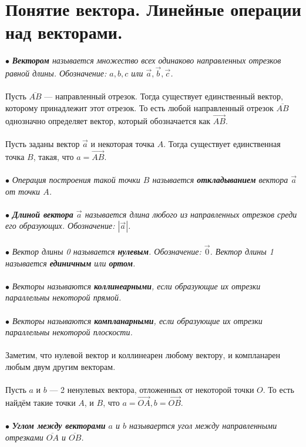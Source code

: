 \section{Понятие вектора. Линейные операции над векторами.}
$\bullet$ \textit{\textbf{Вектором} называется множество всех одинаково направленных отрезков равной длины. Обозначение: $a,b,c$ или $\vec{a}, \vec{b}, \vec{c}$.}\\\\
Пусть $\overline{AB}$ --- направленный отрезок. Тогда существует единственный вектор, которому принадлежит этот отрезок. То есть любой направленный отрезок $\overline{AB}$ однозначно определяет вектор, который обозначается как $\overrightarrow{AB}$.\\\\
Пусть заданы вектор $\vec{a}$ и некоторая точка $A$. Тогда существует единственная точка $B$, такая, что $a = \overrightarrow{AB}$.\\\\
$\bullet$ \textit{Операция построения такой точки $B$ называется \textbf{откладыванием} вектора $\vec{a}$ от точки $A$.\\\\$\bullet$
	\textbf{Длиной вектора} $\vec{a}$ называется длина любого из направленных отрезков среди его образующих. Обозначение: $|\vec{a}|$.}\\\\$\bullet$
\textit{Вектор длины 0 называется \textbf{нулевым}. Обозначение: $\vec{0}$. Вектор длины 1 называется \textbf{единичным} или \textbf{ортом}.}\\\\$\bullet$
\textit{Векторы называются \textbf{коллинеарными}, если образующие их отрезки параллельны
	некоторой прямой.\\\\$\bullet$
	Векторы называются \textbf{компланарными}, если образующие их отрезки параллельны
	некоторой плоскости.}\\\\
Заметим, что нулевой вектор и коллинеарен любому вектору, и компланарен любым двум другим
векторам.\\\\
Пусть $a$ и $b$ --- 2 ненулевых вектора, отложенных от некоторой точки $O$. То есть найдём такие точки $A$, и $B$, что $a = \overrightarrow{OA}, b = \overrightarrow{OB}$.\\\\
$\bullet$ \textit{\textbf{Углом между векторами} $a$ и $b$ называертся угол между направленными отрезками $\overline{OA}$ и $\overline{OB}$.}
